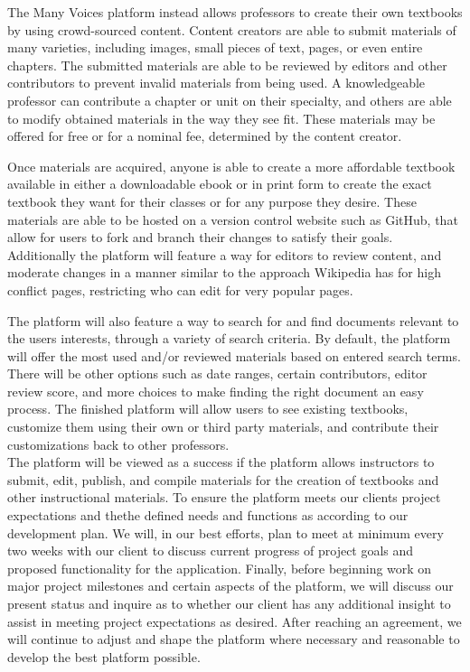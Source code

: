 \documentclass[letterpaper, 10pt, draftclsnofoot, onecolumn]{IEEEtran}
\begin{document}
 The Many Voices platform instead allows professors to create their own textbooks 
by using crowd-sourced content. Content creators are able to submit materials of 
many varieties, including images, small pieces of text, pages, or even entire chapters. 
The submitted materials are able to be reviewed by editors and other contributors to prevent invalid 
materials from being used.
A knowledgeable professor can contribute a chapter or unit on their specialty, and 
others are able to modify obtained materials in the way they see fit. These materials may be
offered for free or for a nominal fee, determined by the content creator.  

Once materials are acquired, anyone is able to create a more affordable textbook available in either
a downloadable ebook or in print form to create the exact textbook they want for their classes
or for any purpose they desire. These materials are able to be hosted on a version control 
website such as GitHub, that allow for users to fork and branch their changes to satisfy their goals.
Additionally the platform will feature a way for editors to review content, and moderate changes in a manner similar
to the approach Wikipedia has for high conflict pages, restricting who can edit for very popular pages.

The platform will also feature a way to search for and find documents relevant to the users interests, 
through a variety of search criteria. By default, the platform will offer the most used and/or reviewed materials
based on entered search terms. There will be other options such as date ranges, certain contributors, 
editor review score, and more choices to make finding the right document an easy process.
The finished platform will allow users to see existing 
textbooks, customize them using their own or third party materials, and contribute their 
customizations back to other professors. \\

The platform will be viewed as a success if the platform allows instructors to submit, edit, publish, 
and compile materials for the creation of textbooks and other instructional materials. 
To ensure the platform meets our clients project expectations and thethe defined needs 
and functions as according to our development plan. We will, in our best efforts, plan to meet at 
minimum every two weeks with our client to discuss current progress of project goals and 
proposed functionality for the application. 
Finally, before beginning work on major project milestones and certain aspects of the platform, we will 
discuss our present status and inquire as to whether our client has any additional insight to assist in 
meeting project expectations as desired. After reaching an agreement, we will continue to adjust 
and shape the platform where necessary and reasonable to develop the best platform possible. \\
\end{document}
